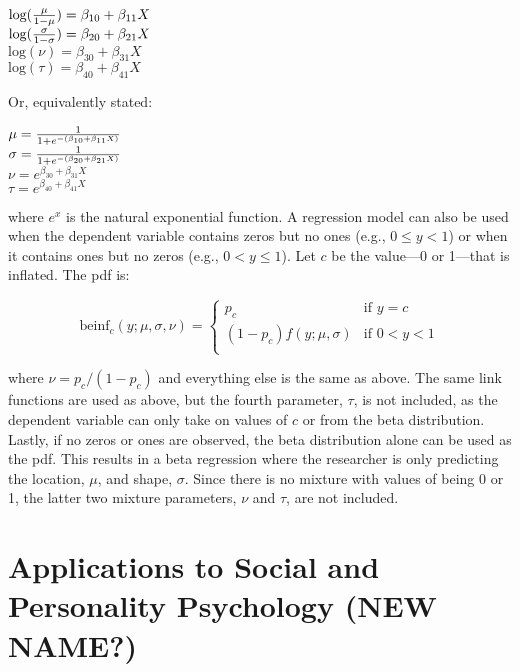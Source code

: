 \documentclass[english,man]{apa6}
\theoremstyle{definition}
\theoremstyle{definition}
\theoremstyle{remark}
\begin{document}
\begin{center}
$\text{log}({\mu \over 1 - \mu}) = \beta_{10} + \beta_{11}X$\\
$\text{log}({\sigma \over 1 - \sigma}) = \beta_{20} + \beta_{21}X$\\
$\text{log}(\nu) = \beta_{30} + \beta_{31}X$\\
$\text{log}(\tau) = \beta_{40} + \beta_{41}X$
\end{center}

Or, equivalently stated:

\begin{center}
$\mu={1\over1+e^{-(\beta_{10}+\beta_{11}X)}}$\\
$\sigma={1\over1+e^{-(\beta_{20}+\beta_{21}X)}}$\\
$\nu = e^{\beta_{30} + \beta_{31}X}$\\
$\tau = e^{\beta_{40} + \beta_{41}X}$
\end{center}

where \(e^x\) is the natural exponential function. A regression model
can also be used when the dependent variable contains zeros but no ones
(e.g., \(0 \leq y < 1\)) or when it contains ones but no zeros (e.g.,
\(0 < y \leq 1\)). Let \(c\) be the value---0 or 1---that is inflated.
The pdf is:

\begin{center}
\[
\text{beinf}_c(y;\mu,\sigma,\nu) =
\begin{cases}
  p_c                             & \text{if } y = c\\
  (1 - p_c)f(y;\mu,\sigma)        & \text{if } 0 < y < 1\\
\end{cases}
\]
\end{center}

where \(\nu = p_c / (1 - p_c)\) and everything else is the same as
above. The same link functions are used as above, but the fourth
parameter, \(\tau\), is not included, as the dependent variable can only
take on values of \(c\) or from the beta distribution. Lastly, if no
zeros or ones are observed, the beta distribution alone can be used as
the pdf. This results in a beta regression where the researcher is only
predicting the location, \(\mu\), and shape, \(\sigma\). Since there is
no mixture with values of being 0 or 1, the latter two mixture
parameters, \(\nu\) and \(\tau\), are not included.

\section{Applications to Social and Personality Psychology (NEW
NAME?)}\label{applications-to-social-and-personality-psychology-new-name}
\end{document}
